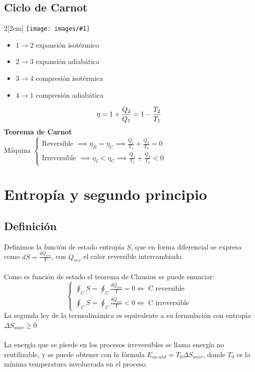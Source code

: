 \documentclass[leqno]{article}
\newcommand{\incimg}[1]{%
    \texttt{[image: images/\#1]}
}
\begin{document}
\subsection{Ciclo de Carnot}
\begin{multicols}{2}[\columnsep2em]
    \incimg{CicloCarnot.png}
\columnbreak                                                                                                   
   \begin{itemize}
     \item $1\to 2$ expansión isotérmico
	 \item  $2\to 3$ expansión adiabática
	 \item  $3\to 4$ compresión isotérmica
   	 \item $4\to 1$ compresión adiabática
   \end{itemize}
   \[
  \eta = 1 + \frac{Q_2}{Q_1} = 1- \frac{T_2}{T_1} \\
   \] 
   \textbf{Teorema de Carnot}\\
   Máquina $\begin{cases}
     \text{Reversible } \implies \eta_R = \eta_C \implies \frac{Q_1}{T_1} + \frac{Q_2}{T_2} = 0 \\
     \text{Irreversible } \implies \eta_I < \eta_C \implies \frac{Q_1}{T_1} + \frac{Q_2}{T_2} < 0 
   \end{cases}$

\end{multicols}

\section{Entropía y segundo principio}
\subsection{Definición}
Definimos la función de estado entropía $S$, que en forma diferencial se expresa como $dS = \frac{\delta Q_{rev}}{T}$, con $Q_{rev}$ el calor reversible intercambiado. \\
\\
Como es función de estado el teorema de Clausius se puede enunciar:
\[
\begin{cases}
  \displaystyle\oint_C S = \oint_C \frac{\delta Q_{rev}}{T} = 0 \iff \text{ C reversible} \\
  \displaystyle\oint_C S = \oint_C \frac{\delta Q_{rev}}{T} <  0 \iff \text{ C irreversible}
\end{cases}
\] 
La segunda ley de la termodinámica es equivalente a su formulación con entropía $\boxed{\Delta S_{univ}\ge 0}$ \\
\\
La energía que se pierde en los procesos irreversibles se llama energía no reutilizable, y se puede obtener con la fórmula $E_{no\ util} = T_0\Delta S_{univ}$, donde $T_0$ es la mínima temperatura involucrada en el proceso.
\end{document}
